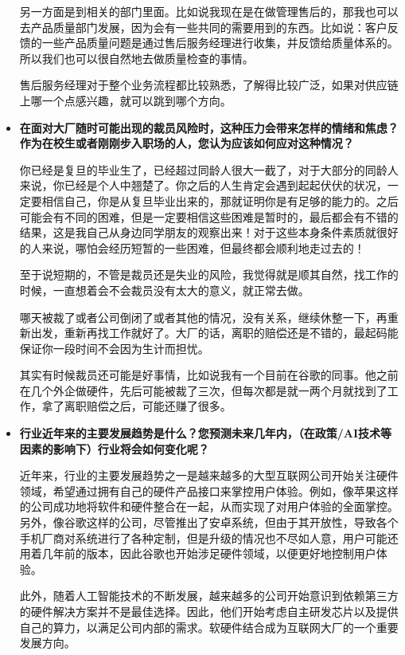 \begin{itemize}
另一方面是到相关的部门里面。比如说我现在是在做管理售后的，那我也可以去产品质量部门发展，因为会有一些共同的需要用到的东西。比如说：客户反馈的一些产品质量问题是通过售后服务经理进行收集，并反馈给质量体系的。所以我们也可以很自然地去做质量检查的事情。

售后服务经理对于整个业务流程都比较熟悉，了解得比较广泛，如果对供应链上哪一个点感兴趣，就可以跳到哪个方向。

    \item \textbf{在面对大厂随时可能出现的裁员风险时，这种压力会带来怎样的情绪和焦虑？作为在校生或者刚刚步入职场的人，您认为应该如何应对这种情况？}
    
你已经是复旦的毕业生了，已经超过同龄人很大一截了，对于大部分的同龄人来说，你已经是个人中翘楚了。你之后的人生肯定会遇到起起伏伏的状况，一定要相信自己，你是从复旦毕业出来的，那就证明你是有足够的能力的。之后可能会有不同的困难，但是一定要相信这些困难是暂时的，最后都会有不错的结果，这是我自己从身边同学朋友的观察出来！对于这些本身条件素质就很好的人来说，哪怕会经历短暂的一些困难，但最终都会顺利地走过去的！

至于说短期的，不管是裁员还是失业的风险，我觉得就是顺其自然，找工作的时候，一直想着会不会裁员没有太大的意义，就正常去做。

哪天被裁了或者公司倒闭了或者其他的情况，没有关系，继续休整一下，再重新出发，重新再找工作就好了。大厂的话，离职的赔偿还是不错的，最起码能保证你一段时间不会因为生计而担忧。

其实有时候裁员还可能是好事情，比如说我有一个目前在谷歌的同事。他之前在几个外企做硬件，先后可能被裁了三次，但每次都是就一两个月就找到了工作，拿了离职赔偿之后，可能还赚了很多。

    \item \textbf{行业近年来的主要发展趋势是什么？您预测未来几年内，（在政策/AI技术等因素的影响下）行业将会如何变化呢？}

    近年来，行业的主要发展趋势之一是越来越多的大型互联网公司开始关注硬件领域，希望通过拥有自己的硬件产品接口来掌控用户体验。例如，像苹果这样的公司成功地将软件和硬件整合在一起，从而实现了对用户体验的全面掌控。另外，像谷歌这样的公司，尽管推出了安卓系统，但由于其开放性，导致各个手机厂商对系统进行了各种定制，但是升级的情况也不尽如人意，用户可能还用着几年前的版本，因此谷歌也开始涉足硬件领域，以便更好地控制用户体验。

此外，随着人工智能技术的不断发展，越来越多的公司开始意识到依赖第三方的硬件解决方案并不是最佳选择。因此，他们开始考虑自主研发芯片以及提供自己的算力，以满足公司内部的需求。软硬件结合成为互联网大厂的一个重要发展方向。


\end{itemize}
